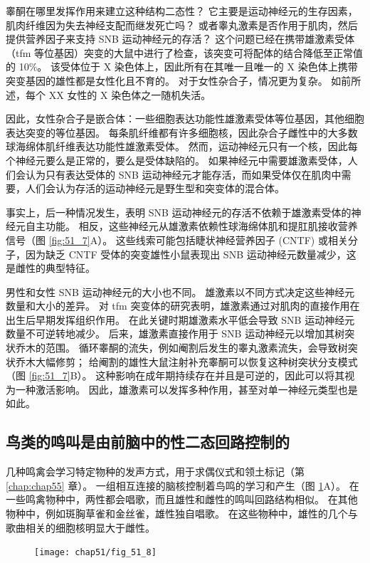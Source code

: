睾酮在哪里发挥作用来建立这种结构二态性？ 它主要是运动神经元的生存因素，肌肉纤维因为失去神经支配而继发死亡吗？ 或者睾丸激素是否作用于肌肉，然后提供营养因子来支持 SNB 运动神经元的存活？ 这个问题已经在携带雄激素受体（tfm 等位基因）突变的大鼠中进行了检查，该突变可将配体的结合降低至正常值的 10\%。 该受体位于 X 染色体上，因此所有在其唯一且唯一的 X 染色体上携带突变基因的雄性都是女性化且不育的。 对于女性杂合子，情况更为复杂。 如前所述，每个 XX 女性的 X 染色体之一随机失活。

因此，女性杂合子是嵌合体：一些细胞表达功能性雄激素受体等位基因，其他细胞表达突变的等位基因。 每条肌纤维都有许多细胞核，因此杂合子雌性中的大多数球海绵体肌纤维表达功能性雄激素受体。 然而，运动神经元只有一个核，因此每个神经元要么是正常的，要么是受体缺陷的。 如果神经元中需要雄激素受体，人们会认为只有表达受体的 SNB 运动神经元才能存活，而如果受体仅在肌肉中需要，人们会认为存活的运动神经元是野生型和突变体的混合体。

事实上，后一种情况发生，表明 SNB 运动神经元的存活不依赖于雄激素受体的神经元自主功能。 相反，这些神经元从雄激素依赖性球海绵体肌和提肛肌接收营养信号（图 \ref{fig:51_7}A）。 这些线索可能包括睫状神经营养因子 (CNTF) 或相关分子，因为缺乏 CNTF 受体的突变雄性小鼠表现出 SNB 运动神经元数量减少，这是雌性的典型特征。

男性和女性 SNB 运动神经元的大小也不同。 雄激素以不同方式决定这些神经元数量和大小的差异。 对 tfm 突变体的研究表明，雄激素通过对肌肉的直接作用在出生后早期发挥组织作用。 在此关键时期雄激素水平低会导致 SNB 运动神经元数量不可逆转地减少。 后来，雄激素直接作用于 SNB 运动神经元以增加其树突状乔木的范围。 循环睾酮的流失，例如阉割后发生的睾丸激素流失，会导致树突状乔木大幅修剪； 给阉割的雄性大鼠注射补充睾酮可以恢复这种树突状分支模式（图 \ref{fig:51_7}B）。 这种影响在成年期持续存在并且是可逆的，因此可以将其视为一种激活影响。 因此，雄激素可以发挥多种作用，甚至对单一神经元类型也是如此。

\subsection{鸟类的鸣叫是由前脑中的性二态回路控制的}
几种鸣禽会学习特定物种的发声方式，用于求偶仪式和领土标记（第 \ref{chap:chap55} 章）。 一组相互连接的脑核控制着鸟鸣的学习和产生（图 \ref{fig:51_8}A）。 在一些鸣禽物种中，两性都会唱歌，而且雄性和雌性的鸣叫回路结构相似。 在其他物种中，例如斑胸草雀和金丝雀，雄性独自唱歌。 在这些物种中，雄性的几个与歌曲相关的细胞核明显大于雌性。

\begin{figure}[htbp]
	\centering
	\texttt{[image: chap51/fig\_51\_8]}
	\caption{}
	\label{fig:51_8}
\end{figure}

